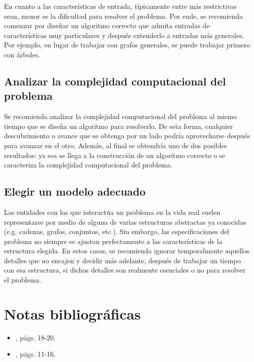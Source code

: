 En cuanto a las características de entrada, típicamente entre más
restrictivas sean, menor es la dificultad para resolver el problema.
Por ende, se recomienda comenzar por diseñar un algoritmo correcto
que admita entradas de características muy particulares y después
extenderlo a entradas más generales. Por ejemplo, en lugar de trabajar
con grafos generales, se puede trabajar primero con árboles.

\subsection{Analizar la complejidad computacional del problema}

Se recomienda analizar la complejidad computacional del problema al
mismo tiempo que se diseña un algoritmo para resolverlo. De esta forma,
cualquier descubrimiento o avance que se obtenga por un lado podría
aprovecharse después para avanzar en el otro. Además, al final se
obtendría uno de dos posibles resultados: ya sea se llega a la construcción
de un algoritmo correcto o se caracteriza la complejidad computacional
del problema.

\subsection{Elegir un modelo adecuado}

Las entidades con las que interactúa un problema en la vida real suelen
representarse por medio de alguna de varias estructuras abstractas
ya conocidas (e.g. cadenas, grafos, conjuntos, etc.). Sin embargo,
las especificaciones del problema no siempre se ajustan perfectamente
a las características de la estructura elegida. En estos casos, se
recomienda ignorar temporalmente aquellos detalles que no encajen
y decidir más adelante, después de trabajar un tiempo con esa estructura,
si dichos detalles son realmente esenciales o no para resolver el
problema. 

\section*{Notas bibliográficas}

\begin{itemize}
    \item \textcite{cormen_introduction_2009}, págs. 18-20. 
    \item \textcite{skiena_algorithm_2011}, págs. 11-16.
\end{itemize}
